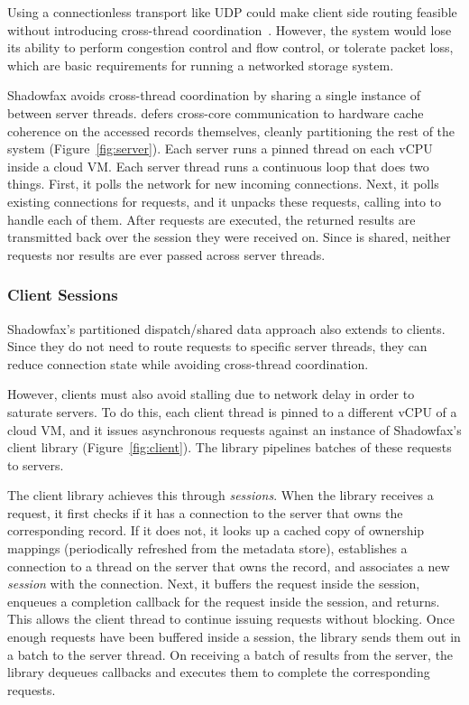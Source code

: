 Using a connectionless transport like UDP could make client side routing
feasible without introducing cross-thread coordination~\cite{fb-memcache,mica}.
%
However, the system would lose its ability to perform congestion
control and flow control, or tolerate packet loss, which
are basic requirements for running a
networked storage system.

Shadowfax avoids cross-thread coordination by sharing a single
instance of \faster between server threads.
%
\faster defers cross-core communication to hardware cache coherence on the
accessed records themselves, cleanly partitioning the rest of the system
(Figure~\ref{fig:server}).
%
Each server runs a pinned thread on each vCPU inside a cloud VM.
%
Each server thread runs a continuous loop that does two things.
%
First, it polls the network for new incoming connections.
%
Next, it polls existing connections for requests, and it unpacks these
requests, calling into \faster to handle each of them.
%
After requests are executed, the returned results are
transmitted back over the session they were received on.
%
Since \faster is shared, neither requests nor results are ever passed across
server threads.

\subsubsection{Client Sessions}
\label{sec:sessions}

Shadowfax's partitioned dispatch/shared data approach also extends to
clients.
%
Since they do not need to route requests to specific server threads, they
can reduce connection state while avoiding cross-thread coordination.

However, clients must also avoid stalling due to network delay in order to
saturate servers.
%
To do this, each client thread is pinned to a different vCPU of a cloud VM,
and it issues asynchronous requests against an instance of
Shadowfax's client library (Figure~\ref{fig:client}).
%
The library pipelines batches of these requests to servers.

The client library achieves this through \emph{sessions}.
%
When the library receives a request, it first checks if it has a
connection to the server that owns the corresponding record.
%
If it does not, it looks up a cached copy of ownership mappings
(periodically refreshed from the metadata store), establishes a
connection to a thread on the server that owns the record, and
associates a new \emph{session} with the connection.
%
Next, it buffers the request inside the session, enqueues a
completion callback for the request inside the session, and returns.
%
This allows the client thread to continue issuing requests without
blocking.
%
Once enough requests have been buffered inside a session, the
library sends them out in a batch to the server thread.
%
On receiving a batch of results from the server, the library
dequeues callbacks and executes them to complete the corresponding
requests.

